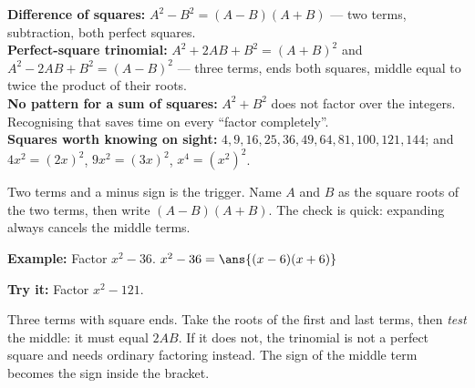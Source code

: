 \documentclass[12pt]{article}
\begin{document}

\begin{formulabox}
\textbf{Difference of squares:} $A^2 - B^2 = (A - B)(A + B)$ --- two terms,
subtraction, both perfect squares.\\[3pt]
\textbf{Perfect-square trinomial:} $A^2 + 2AB + B^2 = (A + B)^2$ and
$A^2 - 2AB + B^2 = (A - B)^2$ --- three terms, ends both squares, middle equal
to twice the product of their roots.\\[3pt]
\textbf{No pattern for a sum of squares:} $A^2 + B^2$ does not factor over the
integers. Recognising that saves time on every ``factor completely''.\\[3pt]
\textbf{Squares worth knowing on sight:} $4, 9, 16, 25, 36, 49, 64, 81, 100,
121, 144$; and $4x^2 = (2x)^2$, $9x^2 = (3x)^2$, $x^4 = (x^2)^2$.
\end{formulabox}


\begin{formulabox}
Two terms and a minus sign is the trigger. Name $A$ and $B$ as the square roots
of the two terms, then write $(A - B)(A + B)$. The check is quick: expanding
always cancels the middle terms.
\end{formulabox}

\begin{examplebox}
\textbf{Example:} Factor $x^2 - 36$.
$x^2 - 36 = \ans{(x-6)(x+6)}$
\end{examplebox}

\begin{tryitbox}
\textbf{Try it:} Factor $x^2 - 121$.\\[2pt]
\end{tryitbox}


\begin{formulabox}
Three terms with square ends. Take the roots of the first and last terms, then
\emph{test} the middle: it must equal $2AB$. If it does not, the trinomial is
not a perfect square and needs ordinary factoring instead. The sign of the
middle term becomes the sign inside the bracket.
\end{formulabox}
\end{document}
